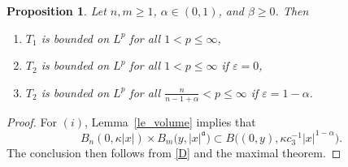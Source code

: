 \documentclass[12pt]{amsart}
\newtheorem{proposition}[theorem]{Proposition}
\begin{document}
\begin{proposition}\label{T1,T2}
Let $n,m\ge 1$, $\alpha\in (0,1)$, and $\beta \ge 0$. Then
\begin{enumerate}[label=(\roman*)]
    \item $T_1$ is bounded on $L^p$ for all $1<p\le \infty$,
    \item $T_2$ is bounded on $L^p$ for all $1<p\le \infty$ if $\varepsilon=0$,
    \item $T_2$ is bounded on $L^p$ for all $\frac{n}{n-1+\alpha}<p\le  \infty$ if $\varepsilon=1-\alpha$.
\end{enumerate}
\end{proposition}

\begin{proof}
For $(i)$, Lemma~\ref{le_volume} implies that
\begin{equation*}
    B_n(0,\kappa|x|) \times B_m\bigl(y,|x|^{\mathfrak a}\bigr) \subset  B\bigl( (0,y), \kappa c_3^{-1}|x|^{1-\alpha} \bigr).
\end{equation*}
The conclusion then follows from \eqref{D} and the maximal theorem.


\end{proof}
\end{document}
